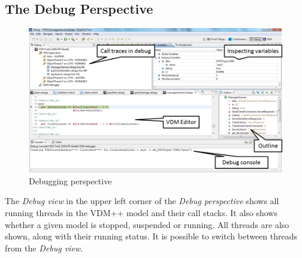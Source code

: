 \subsection{The Debug Perspective}
%
\begin{figure}[htp]
\begin{center}
  \includegraphics[width=5in]{figures/DebuggingVDM}
  \caption[Debugging perspective]{Debugging perspective}
  \label{fig:DebuggingVDM}
\end{center}
\end{figure}
%
The \emph{Debug view} in the upper left corner of the \emph{Debug perspective} shows all running threads in the VDM++ model and their call stacks. It also shows whether a given model is stopped, suspended or running. All threads are also shown, along with their running
status. It is possible to switch between threads from the \emph{Debug view}.

